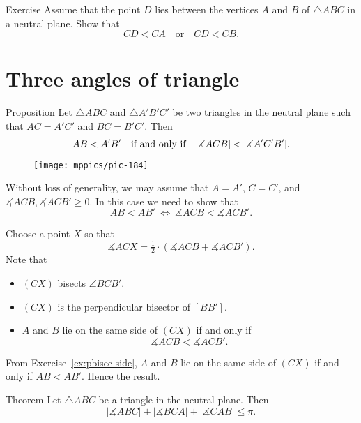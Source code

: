 \begin{thm}{Exercise}\label{ex:chev<side}
Assume that the point $D$ lies between the vertices $A$ and $B$ of $\triangle ABC$ in a neutral plane.
Show that 
$$CD<CA
\quad
\text{or}
\quad
CD<CB.$$

\end{thm}

\section*{Three angles of triangle}

\begin{thm}{Proposition}\label{prop:angle-side}
Let $\triangle ABC$ and $\triangle A'B'C'$ be two triangles in the neutral plane
such that $AC=A'C'$ and $BC=B'C'$.
Then 
$$AB\z<A'B'
\quad
\text{if and only if}
\quad 
|\measuredangle ACB|<|\measuredangle A'C'B'|.$$

\end{thm}

\begin{wrapfigure}{o}{38mm}
\vskip-6mm
\centering
\texttt{[image: mppics/pic-184]}
\end{wrapfigure}

Without loss of generality, we may assume that $A=A'$, $C=C'$, and $\measuredangle ACB,\measuredangle ACB'\ge 0$.
In this case we need to show that 
$$AB<AB'
\ 
\iff
\  
\measuredangle ACB<\measuredangle ACB'.$$

Choose a point $X$ so that 
$$\measuredangle ACX=\tfrac12\cdot(\measuredangle ACB+\measuredangle ACB').$$
Note that 
\begin{itemize}
\item $(CX)$ bisects $\angle BCB'$.
\item $(CX)$ is the perpendicular bisector of $[BB']$.
\item $A$ and $B$ lie on the same side of $(CX)$ if and only if $$\measuredangle ACB<\measuredangle ACB'.$$
\end{itemize}
From Exercise~\ref{ex:pbisec-side}, $A$ and $B$ lie on the same side of $(CX)$ if and only if $AB<AB'$.
Hence the result.
\qeds

\begin{thm}{Theorem}\label{thm:3sum-a}
Let $\triangle ABC$ be a triangle in the neutral plane.
Then 
$$|\measuredangle ABC|+|\measuredangle BCA|+|\measuredangle CAB|\le \pi.$$

\end{thm}

